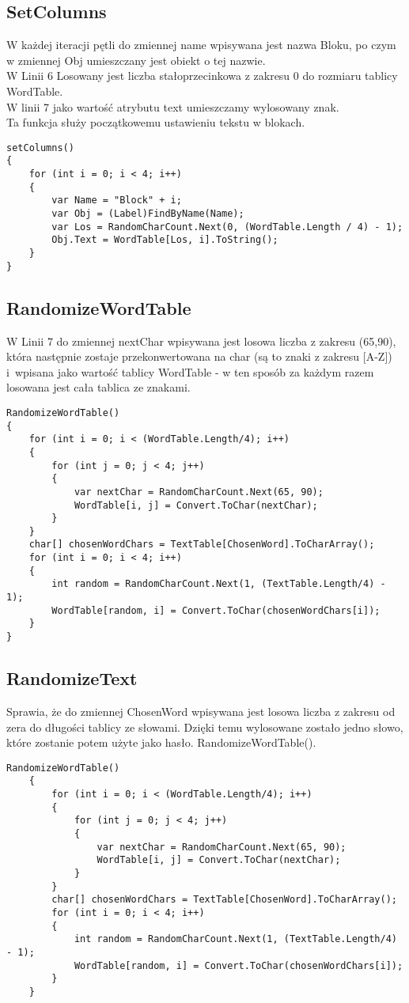 \subsection{SetColumns}
W każdej iteracji pętli do zmiennej name wpisywana jest nazwa Bloku, po czym w zmiennej Obj umieszczany jest obiekt o tej nazwie.
\\W Linii 6 Losowany jest liczba stałoprzecinkowa z zakresu 0 do rozmiaru tablicy WordTable.
\\W linii 7 jako wartość atrybutu text umieszczamy wylosowany znak.
\\Ta funkcja służy początkowemu ustawieniu tekstu w blokach.
\begin{lstlisting}[caption=SetColums]
setColumns()
{
	for (int i = 0; i < 4; i++)
	{
		var Name = "Block" + i;
		var Obj = (Label)FindByName(Name);
		var Los = RandomCharCount.Next(0, (WordTable.Length / 4) - 1);
		Obj.Text = WordTable[Los, i].ToString();
	}
}
\end{lstlisting}

\subsection{RandomizeWordTable}
W Linii 7 do zmiennej nextChar wpisywana jest losowa liczba z zakresu (65,90), która następnie zostaje przekonwertowana na char (są to znaki z zakresu [A-Z]) i~wpisana jako wartość tablicy WordTable - w ten sposób za każdym razem losowana jest cała tablica ze znakami.
\begin{lstlisting}[caption=RandomizeWordTable]
RandomizeWordTable()
{
	for (int i = 0; i < (WordTable.Length/4); i++)
	{
		for (int j = 0; j < 4; j++)
		{
			var nextChar = RandomCharCount.Next(65, 90);
			WordTable[i, j] = Convert.ToChar(nextChar);
		}
	}
	char[] chosenWordChars = TextTable[ChosenWord].ToCharArray();
	for (int i = 0; i < 4; i++)
	{
		int random = RandomCharCount.Next(1, (TextTable.Length/4) - 1);
		WordTable[random, i] = Convert.ToChar(chosenWordChars[i]);
	}
}	
\end{lstlisting}

\subsection{RandomizeText}
Sprawia, że do zmiennej ChosenWord wpisywana jest losowa liczba z zakresu od zera do długości tablicy ze słowami. Dzięki temu wylosowane zostało jedno słowo, które zostanie potem użyte jako hasło.
RandomizeWordTable().
\begin{lstlisting}[caption=RandomizeText]
	RandomizeWordTable()
	{
		for (int i = 0; i < (WordTable.Length/4); i++)
		{
			for (int j = 0; j < 4; j++)
			{
				var nextChar = RandomCharCount.Next(65, 90);
				WordTable[i, j] = Convert.ToChar(nextChar);
			}
		}
		char[] chosenWordChars = TextTable[ChosenWord].ToCharArray();
		for (int i = 0; i < 4; i++)
		{
			int random = RandomCharCount.Next(1, (TextTable.Length/4) - 1);
			WordTable[random, i] = Convert.ToChar(chosenWordChars[i]);
		}
	}	
\end{lstlisting}

